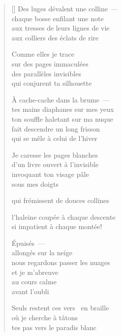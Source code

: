 \documentclass[12pt,a4paper]{article}
\begin{document}
\begin{verse}[\versewidth]
  Des luges dévalent une colline~--- \\
  chaque bosse enfilant une note \\
  aux tresses de leurs lignes de vie \\
  aux colliers des éclats de rire

  Comme elles je trace \\
  sur des pages immaculées \\
  des parallèles invisibles \\
  qui conjurent ta silhouette

  À cache-cache dans la brume~--- \\
  tes mains diaphanes sur mes yeux \\
  ton souffle haletant sur ma nuque \\
  fait descendre un long frisson \\
  qui se mêle à celui de l'hiver

  Je caresse les pages blanches \\
  d'un livre ouvert à l'invisible \\
  invoquant ton visage pâle \\
  sous mes doigts

  qui frémissent de douces collines

  l'haleine coupée à chaque descente \\
  si impatient à chaque montée!

  Épuisés~--- \\
  allongés sur la neige \\
  nous regardons passer les nuages \\
  et je m'abreuve \\
  au cours calme \\
  avant l'oubli

  Seuls restent ces vers \
  en braille \\
  où je cherche à tâtons \\
  tes pas vers le paradis blanc
\end{verse}


\newpage

\poemtitle{}

\settowidth{\versewidth}{où je t'ai réchauffée}

\bigskip
\end{document}
